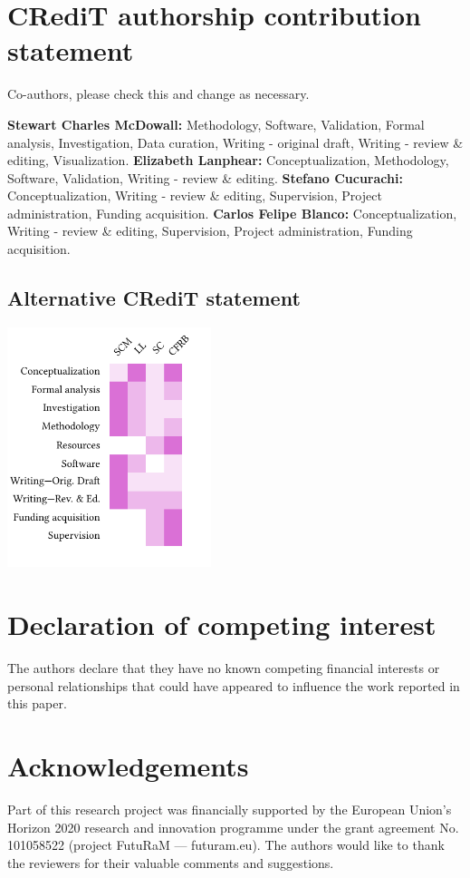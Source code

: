 \documentclass[review,3p,authoryear]{elsarticle}
\newcommand{\cbox}[1]{
    \begin{tcolorbox}[hbox, colback=red!5!white, colframe=red!65!black, boxrule=0.25pt, boxsep=2pt, left=2pt, right=2pt, top=1pt, bottom=1pt]
        \small\sffamily #1
    \end{tcolorbox}
}
\begin{document}
\section*{CRediT authorship contribution statement}
\cbox{Co-authors, please check this and change as necessary.}
\textbf{Stewart Charles McDowall:} Methodology, Software, Validation, Formal analysis, Investigation, Data curation, Writing - original draft, Writing - review \& editing, Visualization.
\textbf{Elizabeth Lanphear:} Conceptualization, Methodology, Software, Validation, Writing - review \& editing.
\textbf{Stefano Cucurachi:} Conceptualization, Writing - review \& editing, Supervision, Project administration, Funding acquisition.
\textbf{Carlos Felipe Blanco:} Conceptualization, Writing - review \& editing, Supervision, Project administration, Funding acquisition.

\subsection*{Alternative CRediT statement}

\includegraphics[width=\columnwidth, height=7cm, keepaspectratio]{credit.pdf}

\section*{Declaration of competing interest}
The authors declare that they have no known competing financial interests or personal relationships that could have appeared to influence the work reported in this paper.

\section*{Acknowledgements}
    Part of this research project was financially supported by the European Union's Horizon 2020 research and innovation programme under the grant agreement No. 101058522 (project FutuRaM --- futuram.eu). The authors would like to thank the reviewers for their valuable comments and suggestions.
\end{document}

